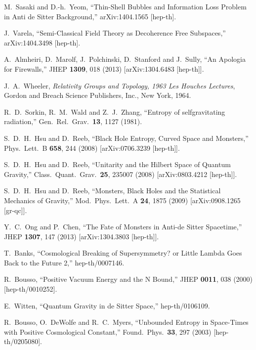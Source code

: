 \documentclass[12pt]{article}
\begin{document}
\begin{thebibliography}{99}
  M.~Sasaki and D.-h.~Yeom,
  ``Thin-Shell Bubbles and Information Loss Problem in Anti de Sitter Background,''
  arXiv:1404.1565 [hep-th].

  J.~Varela,
  ``Semi-Classical Field Theory as Decoherence Free Subspaces,''
  arXiv:1404.3498 [hep-th].

  A.~Almheiri, D.~Marolf, J.~Polchinski, D.~Stanford and J.~Sully,
  ``An Apologia for Firewalls,''
  JHEP {\bf 1309}, 018 (2013)
  [arXiv:1304.6483 [hep-th]].

  J.~A.~Wheeler,
  {\it Relativity Groups and Topology, 1963 Les Houches Lectures},
  Gordon and Breach Science Publishers, Inc., New York, 1964.

  R.~D.~Sorkin, R.~M.~Wald and Z.~J.~Zhang,
  ``Entropy of selfgravitating radiation,''
  Gen.\ Rel.\ Grav.\  {\bf 13}, 1127 (1981).

  S.~D.~H.~Hsu and D.~Reeb,
  ``Black Hole Entropy, Curved Space and Monsters,''
  Phys.\ Lett.\ B {\bf 658}, 244 (2008)
  [arXiv:0706.3239 [hep-th]].

  S.~D.~H.~Hsu and D.~Reeb,
  ``Unitarity and the Hilbert Space of Quantum Gravity,''
  Class.\ Quant.\ Grav.\  {\bf 25}, 235007 (2008)
  [arXiv:0803.4212 [hep-th]].

  S.~D.~H.~Hsu and D.~Reeb,
  ``Monsters, Black Holes and the Statistical Mechanics of Gravity,''
  Mod.\ Phys.\ Lett.\ A {\bf 24}, 1875 (2009)
  [arXiv:0908.1265 [gr-qc]].

  Y.~C.~Ong and P.~Chen,
  ``The Fate of Monsters in Anti-de Sitter Spacetime,''
  JHEP {\bf 1307}, 147 (2013)
  [arXiv:1304.3803 [hep-th]].
  
  T.~Banks,
  ``Cosmological Breaking of Supersymmetry? or Little Lambda Goes Back to the Future 2,''
  hep-th/0007146.
  
  R.~Bousso,
  ``Positive Vacuum Energy and the N Bound,''
  JHEP {\bf 0011}, 038 (2000)
  [hep-th/0010252].
  
  E.~Witten,
  ``Quantum Gravity in de Sitter Space,''
  hep-th/0106109.  
  
  R.~Bousso, O.~DeWolfe and R.~C.~Myers,
  ``Unbounded Entropy in Space-Times with Positive Cosmological Constant,''
  Found.\ Phys.\  {\bf 33}, 297 (2003)
  [hep-th/0205080].
  

\end{thebibliography}
\end{document}
